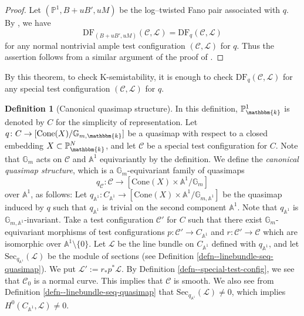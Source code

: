 \documentclass[12pt,twoside]{amsart}
\theoremstyle{definition}
\newtheorem{defn}[thm]{Definition}
\begin{document}
\begin{proof}
    Let $(\mathbb{P}^1,B+uB',uM)$ be the log--twisted Fano pair associated with $q$.
     By \cite[Lemma 2.22]{Hat}, we have 
\[
\mathrm{DF}_{(B+uB',uM)}(\mathcal{C},\mathcal{L})=\mathrm{DF}_{q}(\mathcal{C},\mathcal{L})
\]
for any normal nontrivial ample test configuration $(\mathcal{C},\mathcal{L})$ for $q$.
Thus the assertion follows from a similar argument of the proof of \cite[Corollary A.14]{Hat}. 
\end{proof}


By this theorem, to check K-semistability, it is enough to check $\mathrm{DF}_q(\mathcal{C},\mathcal{L})$ for any special test configuration $(\mathcal{C},\mathcal{L})$ for $q$. 



\begin{defn}[Canonical quasimap structure] 
In this definition, $\mathbb{P}^{1}_{\mathbbm{k}}$ is denoted by $C$ for the simplicity of representation.
Let $q\colon C\to [\mathrm{Cone}(X)/\mathbb{G}_{m, \mathbbm{k}}]$ be a quasimap with respect to a closed embedding $X \subset \mathbb{P}^{N}_{\mathbbm{k}}$, and let $\mathcal{C}$ be a special test configuration for $C$. 
Note that $\mathbb{G}_m$ acts on $\mathcal{C}$ and $\mathbb{A}^1$ equivariantly by the definition.
We define the {\it canonical quasimap structure}, which is a $\mathbb{G}_{m}$-equivariant family of quasimaps 
$$q_{\mathcal{C}}\colon \mathcal{C}\to[\mathrm{Cone}(X)\times \mathbb{A}^1/\mathbb{G}_{m}]$$
over $\mathbb{A}^1$, as follows:  
Let $q_{\mathbb{A}^1}\colon C_{\mathbb{A}^1}\to [\mathrm{Cone}(X)\times \mathbb{A}^1/\mathbb{G}_{m, \mathbb{A}^1}]$ be the quasimap induced by $q$ such that $q_{\mathbb{A}^1}$ is trivial on the second component $\mathbb{A}^1$.
Note that $q_{\mathbb{A}^1}$ is $\mathbb{G}_{m, \mathbb{A}^1}$-invariant. 
Take a test configuration $\mathcal{C}'$ for $C$ such that there exist $\mathbb{G}_{m}$-equivariant morphisms of test configurations $p\colon\mathcal{C}'\to C_{\mathbb{A}^1}$ and $r\colon\mathcal{C}'\to \mathcal{C}$ which are isomorphic over $\mathbb{A}^1\setminus\{0\}$.
Let $\mathscr{L}$ be the line bundle on $C_{\mathbb{A}^1}$ defined with $q_{\mathbb{A}^1}$, and let $\mathrm{Sec}_{q_{\mathbb{A}^1}}(\mathscr{L})$ be the module of sections (see Definition \ref{defn--linebundle-seq-quasimap}).
We put $\mathscr{L}':=r_*p^*\mathscr{L}$. 
By Definition \ref{defn--special-test-config}, we see that $\mathcal{C}_{0}$ is a normal curve. 
This implies that $\mathcal{C}$ is smooth.  
We also see from Definition \ref{defn--linebundle-seq-quasimap} that $\mathrm{Sec}_{q_{\mathbb{A}^1}}(\mathscr{L}) \neq0$, which implies $H^{0}(C_{\mathbb{A}^1}, \mathscr{L}) \neq 0$. 

\end{defn}
\end{document}
